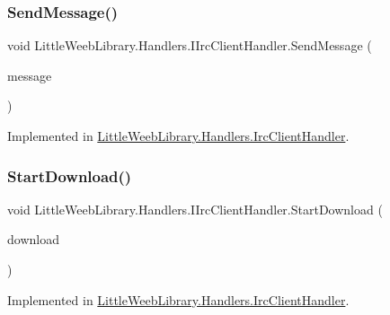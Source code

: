 \subsubsection{\texorpdfstring{Send\+Message()}{SendMessage()}}
{\footnotesize\ttfamily void Little\+Weeb\+Library.\+Handlers.\+I\+Irc\+Client\+Handler.\+Send\+Message (\begin{DoxyParamCaption}\item[{string}]{message }\end{DoxyParamCaption})}



Implemented in \mbox{\hyperlink{class_little_weeb_library_1_1_handlers_1_1_irc_client_handler_ae28984176dff0eda63604b8e5c25abb4}{Little\+Weeb\+Library.\+Handlers.\+Irc\+Client\+Handler}}.

\mbox{\label{interface_little_weeb_library_1_1_handlers_1_1_i_irc_client_handler_af14486a1ffa0b1d4ab3058f442ee9d6a}} 
\subsubsection{\texorpdfstring{Start\+Download()}{StartDownload()}}
{\footnotesize\ttfamily void Little\+Weeb\+Library.\+Handlers.\+I\+Irc\+Client\+Handler.\+Start\+Download (\begin{DoxyParamCaption}\item[{\mbox{\hyperlink{class_little_weeb_library_1_1_models_1_1_json_download_info}{Json\+Download\+Info}}}]{download }\end{DoxyParamCaption})}



Implemented in \mbox{\hyperlink{class_little_weeb_library_1_1_handlers_1_1_irc_client_handler_afa3e3e60cc12d3867d3c6e2a188dca14}{Little\+Weeb\+Library.\+Handlers.\+Irc\+Client\+Handler}}.

\mbox{\label{interface_little_weeb_library_1_1_handlers_1_1_i_irc_client_handler_a0a814a058f665efda8c88eb5306658f5}} 
